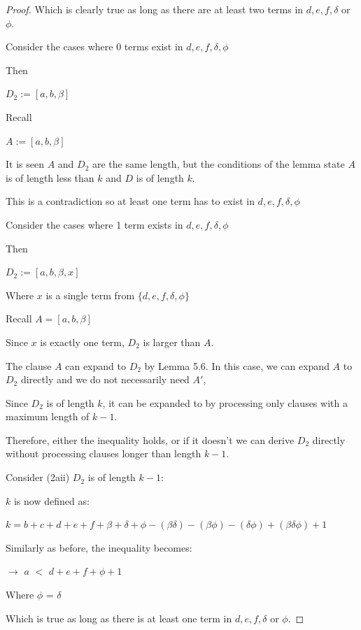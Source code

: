 \documentclass[manuscript]{acmart}
\begin{document}
\begin{proof}
        Which is clearly true as long as there are at least two terms in $d, e, f, \delta$ or $\phi$.

        Consider the cases where 0 terms exist in $d, e, f, \delta, \phi$

        Then 
        
        $D_2 := [a, b, \beta]$

        Recall 

        $A := [a, b, \beta]$

        It is seen $A$ and $D_2$ are the same length, but the conditions of the lemma state
        $A$ is of length less than $k$ and $D$ is of length $k$. 

        This is a contradiction so at least one term has to exist in $d, e, f, \delta, \phi$

        Consider the cases where 1 term exists in $d, e, f, \delta, \phi$

        Then 
        
        $D_2 := [a, b, \beta, x]$

        Where $x$ is a single term from $\{d, e, f, \delta, \phi\}$
        
        Recall $A = [a, b, \beta]$

        Since $x$ is exactly one term, $D_2$ is larger than $A$.

        The clause $A$ can expand to $D_2$ by Lemma 5.6. In this case, 
        we can expand $A$ to $D_2$ directly and we do not necessarily 
        need $A'$,
        
        Since $D_2$ is of length $k$, it can be expanded to by processing
        only clauses with a maximum length of $k-1$.

        Therefore, either the inequality holds, or if it doesn't we can
        derive $D_2$ directly without processing clauses longer than length $k-1$.

        Consider (2aii) $D_2$ is of length $k - 1$:

        $k$ is now defined as:

        $k = b + c + d + e + f + \beta + \delta + \phi - (\beta \delta) 
        - (\beta \phi) - (\delta \phi) + (\beta \delta \phi) + 1$

        Similarly as before, the inequality becomes:

        $\rightarrow$ $a$ $<$ $d + e + f + \phi + 1$

        Where $\phi$ = $\delta$

        Which is true as long as there is at least one term in
        $d, e, f, \delta$ or $\phi$.


\end{proof}
\end{document}
